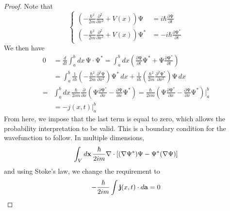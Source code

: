\begin{proof}
Note that
\[
\left\{
\begin{aligned}
\left( -\frac{\hbar^2}{2m} \frac{\partial^2}{\partial x^2} + V(x) \right) \mathrm{\Psi}  &= i\hbar \frac{\partial \mathrm{\Psi} }{\partial t} \\
\left( -\frac{\hbar^2}{2m} \frac{\partial^2}{\partial x^2} + V(x) \right) \mathrm{\Psi} ^* &= -i\hbar \frac{\partial \mathrm{\Psi} ^*}{\partial t}
\end{aligned}
\right.
\]
We then have
\begin{align*}
0 &= \frac{d}{dt} \int_a^b dx\, \mathrm{\Psi} \cdot \mathrm{\Psi} ^* 
= \int_a^b dx \left( \frac{\partial \mathrm{\Psi} 	}{\partial t} \mathrm{\Psi} ^* + \mathrm{\Psi}  \frac{\partial \mathrm{\Psi} ^*}{\partial t} \right) \\
&= \int_a^b \frac{1}{i\hbar} \left( -\frac{\hbar^2}{2m} \frac{\partial^2 \mathrm{\Psi} }{\partial x^2} \right) \mathrm{\Psi} ^* \, dx 
+ \frac{1}{i\hbar} \left( \frac{\hbar^2}{2m} \frac{\partial^2 \mathrm{\Psi} ^*}{\partial x^2} \right) \mathrm{\Psi}  \, dx\\=& \int_a^b dx \, \frac{\hbar}{2im} \frac{\partial}{\partial x} \left( \mathrm{\Psi}  \frac{\partial \mathrm{\Psi} ^*}{\partial x} - \frac{\partial \mathrm{\Psi} }{\partial x} \mathrm{\Psi} ^* \right) = \frac{\hbar}{2im} \left( \mathrm{\Psi} \frac{\partial \mathrm{\Psi} ^*}{\partial x} - \frac{\partial \mathrm{\Psi} }{\partial x} \mathrm{\Psi} ^* \right) \Big|_a^b \\
&= - j(x, t) \Big|_a^b
\end{align*}
From here, we impose that the last term is equal to zero, which allows the probability interpretation to be valid. This is a boundary condition for the wavefunction to follow. In multiple dimensions, 
\[\int _{V}d{\bf x}\,\dfrac{\hbar }{2im}\nabla \cdot [(\nabla \mathrm{\Psi} ^{*})\mathrm{\Psi} -\mathrm{\Psi} ^{*}(\nabla \mathrm{\Psi} )]\]
and using Stoke's law, we change the requirement to
\[-\dfrac{\hbar }{2im}\int {\bf j}(x,t)\cdot d{\bf a}=0\]
\end{proof}
\vspace{2ex}


